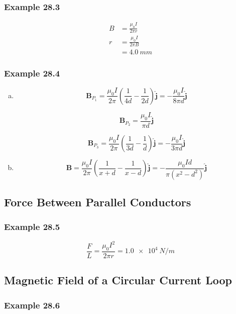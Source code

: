 \documentclass{article}
\begin{document}
\subsubsection{Example 28.3}

\begin{align*}
  B & = \frac{\mu_0 I}{2 \pi r} \\
  r & = \frac{\mu_0 I}{2 \pi B} \\
    & = \qty{4.0}{mm}
\end{align*}

\subsubsection{Example 28.4}

\begin{enumerate}[(a)]
  \item

        \[\mathbf{B}_{P_1} = \frac{\mu_0 I}{2 \pi} \left( \frac{1}{4 d} - \frac{1}{2 d} \right) \hat{\mathbf{j}} = -\frac{\mu_0 I}{8 \pi d} \hat{\mathbf{j}}\]

        \[\mathbf{B}_{P_2} = \frac{\mu_0 I}{\pi d} \hat{\mathbf{j}}\]

        \[\mathbf{B}_{P_3} = \frac{\mu_0 I}{2 \pi} \left( \frac{1}{3 d} - \frac{1}{d} \right) \hat{\mathbf{j}} = -\frac{\mu_0 I}{3 \pi d} \hat{\mathbf{j}}\]

  \item \[\mathbf{B} = \frac{\mu_0 I}{2 \pi} \left( \frac{1}{x + d} - \frac{1}{x - d} \right) \hat{\mathbf{j}} = -\frac{\mu_0 I d}{\pi (x^2 - d^2)} \hat{\mathbf{j}}\]
\end{enumerate}

\subsection{Force Between Parallel Conductors}

\subsubsection{Example 28.5}

\[\frac{F}{L} = \frac{\mu_0 I^2}{2 \pi r} = \qty{1.0e4}{N/m}\]

\subsection{Magnetic Field of a Circular Current Loop}

\subsubsection{Example 28.6}
\end{document}
